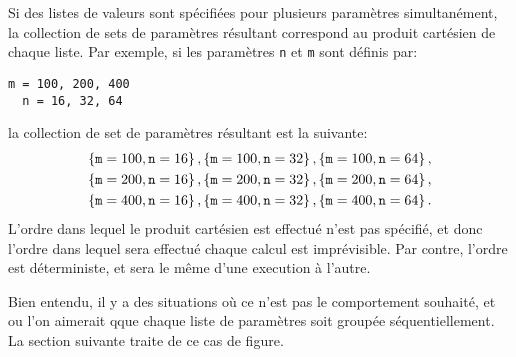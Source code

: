Si des listes de valeurs sont sp\'ecifi\'ees pour plusieurs
param\`etres simultan\'ement, la collection de sets de param\`etres
r\'esultant correspond au produit cart\'esien de chaque liste. Par
exemple, si les param\`etres \texttt{n} et \texttt{m} sont d\'efinis
par:
\begin{lstlisting}[language={},frame=single,basicstyle=\ttfamily]
  m = 100, 200, 400
  n = 16, 32, 64
\end{lstlisting}
la collection de set de param\`etres r\'esultant est la suivante:
\begin{align*}
  \left\{ \mathtt{m} = 100, \mathtt{n} = 16 \right\}, \left\{ \mathtt{m} =
    100, \mathtt{n} = 32 \right\}, \left\{ \mathtt{m} = 100, \mathtt{n} =
    64 \right\},\\
  \left\{ \mathtt{m} = 200, \mathtt{n} = 16 \right\}, \left\{ \mathtt{m} =
      200, \mathtt{n} = 32 \right\}, \left\{ \mathtt{m} = 200, \mathtt{n} =
      64 \right\},\\
  \left\{ \mathtt{m} = 400, \mathtt{n} = 16 \right\}, \left\{ \mathtt{m} = 400, \mathtt{n} = 32 \right\}, \left\{ \mathtt{m} = 400, \mathtt{n} = 64 \right\}.
\end{align*}
L'ordre dans lequel le produit cart\'esien est effectu\'e n'est pas
sp\'ecifi\'e, et donc l'ordre dans lequel sera effectu\'e chaque
calcul est impr\'evisible. Par contre, l'ordre est d\'eterministe, et
sera le m\^eme d'une execution \`a l'autre.

Bien entendu, il y a des situations o\`u ce n'est pas le comportement
souhait\'e, et ou l'on aimerait qque chaque liste de param\`etres soit group\'ee
s\'equentiellement. La section suivante traite de ce cas de figure.

